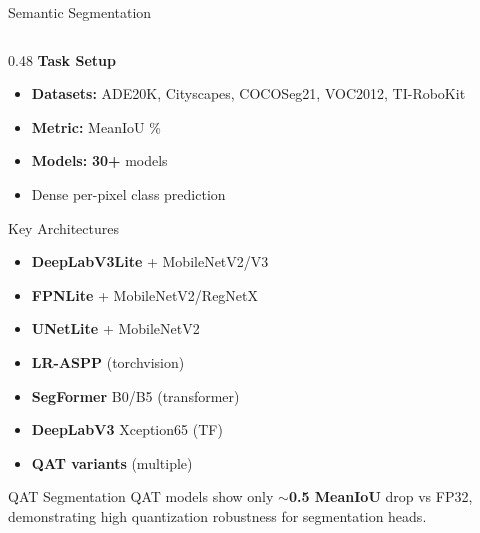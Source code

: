 \documentclass[aspectratio=169,12pt]{beamer}
\newcommand{\highlight}[1]{\textcolor{TIRed}{\textbf{#1}}}
\begin{document}
\begin{frame}{Semantic Segmentation}
  \begin{columns}[T]
    \begin{column}{0.48\textwidth}
      \textbf{Task Setup}
      \begin{itemize}\footnotesize
        \item \textbf{Datasets:} ADE20K, Cityscapes, COCOSeg21, VOC2012, TI-RoboKit
        \item \textbf{Metric:} MeanIoU \%
        \item \textbf{Models:} \highlight{30+} models
        \item Dense per-pixel class prediction
      \end{itemize}

      \vspace{0.3cm}
      \begin{block}{Key Architectures}
        \begin{itemize}\scriptsize
          \item \textbf{DeepLabV3Lite} + MobileNetV2/V3
          \item \textbf{FPNLite} + MobileNetV2/RegNetX
          \item \textbf{UNetLite} + MobileNetV2
          \item \textbf{LR-ASPP} (torchvision)
          \item \textbf{SegFormer} B0/B5 (transformer)
          \item \textbf{DeepLabV3} Xception65 (TF)
          \item \textbf{QAT variants} (multiple)
        \end{itemize}
      \end{block}

      \vspace{0.2cm}
      \begin{alertblock}{QAT Segmentation}
        \scriptsize QAT models show only \textbf{$\sim$0.5 MeanIoU} drop vs FP32,
        demonstrating high quantization robustness for segmentation heads.
      \end{alertblock}
    \end{column}


\end{columns}
\end{frame}
\end{document}
